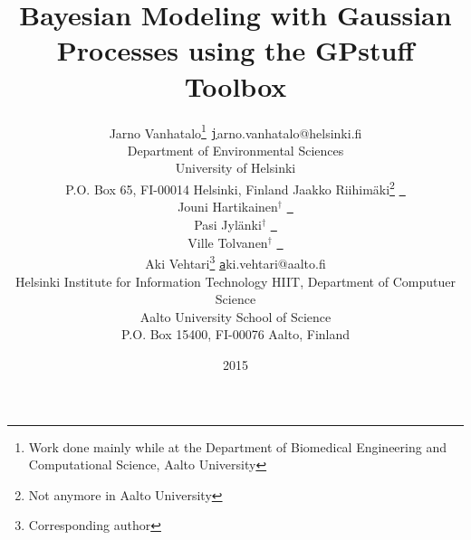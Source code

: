 \documentclass[twoside,11pt]{article}
\newcommand{\pkg}[1]{{\fontseries{b}\selectfont #1}}
\newcommand{\email}[1]{\href{mailto:#1}{\normalfont\texttt{#1}}}
\begin{document}
\title{Bayesian Modeling with Gaussian Processes using the
   \pkg{GPstuff} Toolbox}

\date{2015}

\author{\name Jarno Vanhatalo\thanks{Work done mainly while at the
    Department of Biomedical
    Engineering and Computational Science, Aalto University} \email jarno.vanhatalo@helsinki.fi \\
  \addr Department of Environmental Sciences\\
  University of Helsinki\\
  P.O. Box 65, FI-00014 Helsinki, Finland \AND
  \name Jaakko Riihim\"aki\thanks{Not anymore in Aalto University} \email { } \\
  \name Jouni Hartikainen$^{\dagger}$ \email { } \\
  \name Pasi Jyl\"anki$^{\dagger}$ \email { } \\
  \name Ville Tolvanen$^{\dagger}$ \email { } \\
  \name Aki Vehtari\thanks{Corresponding author} \email aki.vehtari@aalto.fi \\
  \addr Helsinki Institute for Information Technology HIIT, Department of Computuer Science\\
  Aalto University School of Science\\
  P.O. Box 15400, FI-00076 Aalto, Finland}

\maketitle
\end{document}
